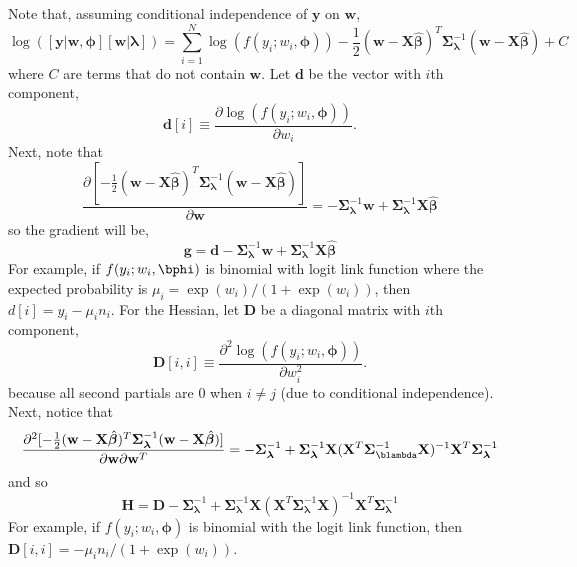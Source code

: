 \documentclass[12pt, titlepage]{article}
\begin{document}
Note that, assuming conditional independence of $\mathbf{y}$ on $\mathbf{w}$,
$$
\log([\mathbf{y}|\mathbf{w},\boldsymbol{\phi}][\mathbf{w}|\boldsymbol{\lambda}]) = \sum_{i = 1}^N \log(f(y_i;w_i,\boldsymbol{\phi})) - \frac{1}{2}(\mathbf{w} - \mathbf{X}\hat{\boldsymbol{\beta}})^{T}\boldsymbol{\Sigma}_{\boldsymbol{\lambda}}^{-1}(\mathbf{w} - \mathbf{X}\hat{\boldsymbol{\beta}}) + C
$$
where $C$ are terms that do not contain $\mathbf{w}$. Let $\mathbf{d}$ be the vector with $i$th component,
$$
\mathbf{d}[i] \equiv \frac{\partial\log(f(y_i;w_i,\boldsymbol{\phi}))}{\partial w_i}.
$$
Next, note that
$$
\frac{\partial [-\frac{1}{2}(\mathbf{w} - \mathbf{X}\hat{\boldsymbol{\beta}})^{T}\boldsymbol{\Sigma}_{\boldsymbol{\lambda}}^{-1}(\mathbf{w} - \mathbf{X}\hat{\boldsymbol{\beta}})]}{\partial \mathbf{w}} = -\boldsymbol{\Sigma}_{\boldsymbol{\lambda}}^{-1}\mathbf{w} + \boldsymbol{\Sigma}_{\boldsymbol{\lambda}}^{-1}\boldsymbol{X}\hat{\boldsymbol{\beta}}
$$
so the gradient will be,
$$
\mathbf{g} = \mathbf{d} - \boldsymbol{\Sigma}_{\boldsymbol{\lambda}}^{-1}\mathbf{w} + \boldsymbol{\Sigma}_{\boldsymbol{\lambda}}^{-1}\mathbf{X}\hat{\boldsymbol{\beta}}
$$
For example, if $f(y_i;w_i,\bphi)$ is binomial with logit link function where the expected probability is $\mu_{i} = \exp(w_{i})/(1 + \exp(w_{i}))$, then $d[i] = y_i - \mu_{i}n_i$.  For the Hessian, let $\mathbf{D}$ be a diagonal matrix with $i$th component,
$$
\mathbf{D}[i,i] \equiv \frac{\partial^2\log(f(y_i;w_i,\boldsymbol{\phi}))}{\partial w_i^2}.
$$
because all second partials are 0 when $i \neq j$ (due to conditional independence). Next, notice that
$$
\frac{\partial^2 [-\frac{1}{2}(\mathbf{w} - \mathbf{X}\hat{\boldsymbol{\beta}})^{T}\boldsymbol{\Sigma}_{\boldsymbol{\lambda}}^{-1}(\mathbf{w} - \mathbf{X}\hat{\boldsymbol{\beta}})] }{\partial \mathbf{w} \partial \mathbf{w}^{T}} =
	-\boldsymbol{\Sigma}_{\boldsymbol{\lambda}}^{-1} + \boldsymbol{\Sigma}_{\boldsymbol{\lambda}}^{-1}\mathbf{X}(\mathbf{X}^{T}\boldsymbol{\Sigma}_{\boldsymbol{\blambda}}^{-1}\mathbf{X})^{-1}\mathbf{X}^{T}\boldsymbol{\Sigma}_{\boldsymbol{\lambda}}^{-1}
$$
and so
\begin{equation} \label{eq:Hdef}
\mathbf{H} = \mathbf{D} -\boldsymbol{\Sigma}_{\boldsymbol{\lambda}}^{-1} + 
	\boldsymbol{\Sigma}_{\boldsymbol{\lambda}}^{-1}\mathbf{X}(\mathbf{X}^{T}\boldsymbol{\Sigma}_{\boldsymbol{\lambda}}^{-1}\mathbf{X})^{-1}\mathbf{X}^{T}\boldsymbol{\Sigma}_{\boldsymbol{\lambda}}^{-1}
\end{equation}
For example, if $f(y_i;w_i,\boldsymbol{\phi})$ is binomial with the logit link function, then $\mathbf{D}[i,i] = -\mu_i n_i/(1 + \exp(w_i))$.
\end{document}
